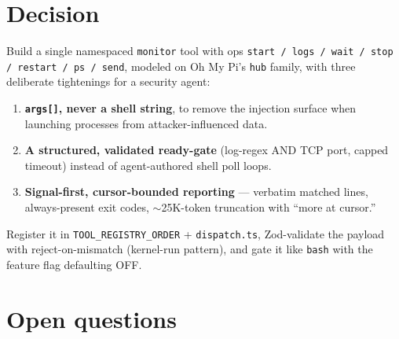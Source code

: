 \documentclass[11pt]{article}
\begin{document}
\section{Decision}

Build a single namespaced \texttt{monitor} tool with ops
\texttt{start / logs / wait / stop / restart / ps / send}, modeled on Oh My Pi's
\texttt{hub} family, with three deliberate tightenings for a security agent:

\begin{enumerate}[leftmargin=*]
  \item \textbf{\texttt{args[]}, never a shell string}, to remove the injection
  surface when launching processes from attacker-influenced data.
  \item \textbf{A structured, validated ready-gate} (log-regex AND TCP port,
  capped timeout) instead of agent-authored shell poll loops.
  \item \textbf{Signal-first, cursor-bounded reporting} --- verbatim matched
  lines, always-present exit codes, $\sim$25K-token truncation with ``more at
  cursor.''
\end{enumerate}

Register it in \texttt{TOOL\_REGISTRY\_ORDER} + \texttt{dispatch.ts},
Zod-validate the payload with reject-on-mismatch (kernel-run pattern), and gate it
like \texttt{bash} with the feature flag defaulting OFF.

\section{Open questions}
\end{document}
